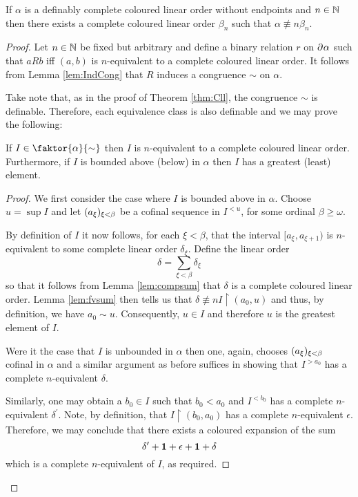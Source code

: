 \begin{prp}\label{prp:defcomp}
	If $\alpha$ is a definably complete coloured linear order without endpoints and $n\in\mathbb{N}$ then there exists a complete coloured linear order $\beta_n$ such that $\alpha\nequiv{n}\beta_n$.
\end{prp}
\begin{proof}
	Let $n\in\mathbb{N}$ be fixed but arbitrary and define a binary relation $r$ on $\partial^{}{}\alpha$ such that $aRb$ iff $(a,b)$ is $n$-equivalent to a complete coloured linear order.  It follows from Lemma \ref{lem:IndCong} that $R$ induces a congruence $\sim$ on $\alpha$.

	Take note that, as in the proof of Theorem \ref{thm:Cll}, the congruence $\sim$ is definable.  Therefore, each equivalence class is also definable and we may prove the following:

	\begin{claim}
		If $I\in\faktor{\alpha}{\sim}$ then $I$ is $n$-equivalent to a complete coloured linear order.  Furthermore, if $I$ is bounded above (below) in $\alpha$ then $I$ has a greatest (least) element.
	\end{claim}
	\begin{proof}
		We first consider the case where $I$ is bounded above in $\alpha$.  Choose $u=\sup I$ and let $(a_\xi)_{\xi<\beta}$ be a cofinal sequence in $I^{<u}$, for some ordinal $\beta\geq\omega$.

		By definition of $I$ it now follows, for each $\xi<\beta$, that the interval $[a_\xi,a_{\xi+1})$ is $n$-equivalent to some complete linear order $\delta_\xi$.  Define the linear order
		\begin{equation}
			\delta=\sum_{\xi<\beta}\delta_\xi
		\end{equation}
		so that it follows from Lemma \ref{lem:compsum} that $\delta$ is a complete coloured linear order.  Lemma \ref{lem:fvsum} then tells us that $\delta\nequiv{n}I\restriction(a_0,u)$ and thus, by definition, we have $a_0\sim u$.  Consequently, $u\in I$ and therefore $u$ is the greatest element of $I$.

		Were it the case that $I$ is unbounded in $\alpha$ then one, again, chooses $(a_\xi)_{\xi<\beta}$ cofinal in $\alpha$ and a similar argument as before suffices in showing that $I^{>a_0}$ has a complete $n$-equivalent $\delta$.

		Similarly, one may obtain a $b_0\in I$ such that $b_0<a_0$ and $I^{<b_0}$ has a complete $n$-equivalent $\delta^\prime$.  Note, by definition, that $I\restriction (b_0,a_0)$ has a complete $n$-equivalent $\epsilon$.  Therefore, we may conclude that there exists a coloured expansion of the sum
		\begin{equation}
			\delta^\prime+\mathbf{1}+\epsilon+\mathbf{1}+\delta
		\end{equation}
		which is a complete $n$-equivalent of $I$, as required.
	\end{proof}


\end{proof}
